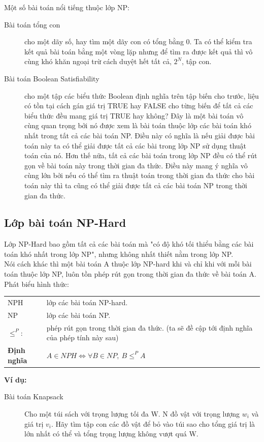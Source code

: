 \documentclass[a4paper 14pt]{article}
\begin{document}
			\vspace{0.5cm}
			
			Một số bài toán nổi tiếng thuộc lớp NP:\\ 
			\begin{description}
				\item[Bài toán tổng con] cho một dãy số, hay tìm một dãy con có tổng bằng 0. Ta có thể kiểm tra kết quả bài toán bằng một vòng lặp nhưng để tìm ra được kết quả thì vô cùng khó khăn ngoại trừ cách duyệt hết tất cả, $2^N$, tập con.
				\item[Bài toán Boolean Satisfiability] \label{EX: NP-C} cho một tập các biểu thức Boolean định nghĩa trên tập biến cho trước, liệu có tồn tại cách gán giá trị TRUE hay FALSE cho từng biến để tất cả các biểu thức đều mang giá trị TRUE hay không? Đây là một bài toán vô cùng quan trọng bởi nó được xem là bài toán thuộc lớp các bài toán khó nhất trong tất cả các bài toán NP. Điều này có nghĩa là nếu giải được bài toán này ta có thể giải được tất cả các bài trong lớp NP sử dụng thuật toán của nó. Hơn thế nữa, tất cả các bài toán trong lớp NP đều có thể rút gọn về bài toán này trong thời gian đa thức. Điều này mang ý nghĩa vô cùng lớn bởi nếu có thể tìm ra thuật toán trong thời gian đa thức cho bài toán này thì ta cũng có thể giải được tất cả các bài toán NP trong thời gian đa thức.
			\end{description}
		\subsection{Lớp bài toán NP-Hard}
			Lớp NP-Hard bao gồm tất cả các bài toán mà "có độ khó tối thiểu bằng các bài toán khó nhất trong lớp NP", nhưng không nhất thiết nằm trong lớp NP.\\
			Nói cách khác thì một bài toán A thuộc lớp NP-hard khi và chỉ khi với mỗi bài toán thuộc lớp NP, luôn tồn phép rút gọn trong thời gian đa thức về bài toán A.\\
			Phát biểu hình thức:
			\begin{addmargin}{0.5in}
				\begin{tabular}{l p{4in}}
				NPH& lớp các bài toán NP-hard.\\
				NP& lớp các bài toán NP.\\
				$\leq^{P}:$& phép rút gọn trong thời gian đa thức. (ta sẽ đề cập tới định nghĩa của phép tính này sau)\\
				\textbf{Định nghĩa}&$A \in NPH \Leftrightarrow \forall B \in NP,~ B \leq^{P} A$
				\end{tabular}
			\end{addmargin}
			\textbf{Ví dụ:}
			\begin{description}
				\item[Bài toán Knapsack]  Cho một túi sách với trọng lượng tối đa W. N đồ vật với trọng lượng $w_{i}$ và giá trị $v_{i}$. Hãy tìm tập con các đồ vật để bỏ vào túi sao cho tổng giá trị là lớn nhất có thể và tổng trọng lượng không vượt quá W.
			\end{description}
\end{document}

